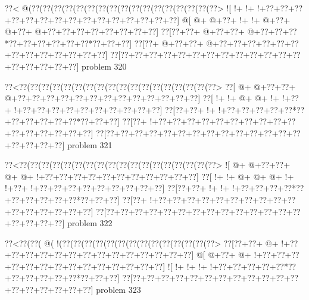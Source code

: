 \vbox{\vbox{\goo
\0??<\- @(\0??(\0??(\0??(\0??(\0??(\0??(\0??(\0??(\0??(\0??(\0??(\0??(\0??(\0??(\0??(\0??(\0??>
\- ![\- !+\- !+\- !+\0??+\0??+\0??+\0??+\0??+\0??+\0??+\0??+\0??+\0??+\0??+\0??+\0??+\0??+\0??]
\- @[\- @+\- @+\0??+\- !+\- !+\- @+\0??+\- @+\0??+\- @+\0??+\0??+\0??+\0??+\0??+\0??+\0??+\0??]
\0??[\0??+\0??+\- @+\0??+\0??+\- @+\0??+\0??+\0??*\0??+\0??+\0??+\0??+\0??+\0??*\0??+\0??+\0??]
\0??[\0??+\- @+\0??+\0??+\- @+\0??+\0??+\0??+\0??+\0??+\0??+\0??+\0??+\0??+\0??+\0??+\0??+\0??]
\0??[\0??+\0??+\0??+\0??+\0??+\0??+\0??+\0??+\0??+\0??+\0??+\0??+\0??+\0??+\0??+\0??+\0??+\0??]
}
\hfil problem 320\hfil\break
}



\vbox{\vbox{\goo
\0??<\0??(\0??(\0??(\0??(\0??(\0??(\0??(\0??(\0??(\0??(\0??(\0??(\0??(\0??(\0??(\0??(\0??(\0??>
\0??[\- @+\- @+\0??+\0??+\- @+\0??+\0??+\0??+\0??+\0??+\0??+\0??+\0??+\0??+\0??+\0??+\0??+\0??]
\0??[\- !+\- !+\- @+\- @+\- !+\- !+\0??+\- !+\0??+\0??+\0??+\0??+\0??+\0??+\0??+\0??+\0??+\0??]
\0??[\0??+\0??+\- !+\- !+\0??+\0??+\0??+\0??+\0??*\0??+\0??+\0??+\0??+\0??+\0??*\0??+\0??+\0??]
\0??[\0??+\- !+\0??+\0??+\0??+\0??+\0??+\0??+\0??+\0??+\0??+\0??+\0??+\0??+\0??+\0??+\0??+\0??]
\0??[\0??+\0??+\0??+\0??+\0??+\0??+\0??+\0??+\0??+\0??+\0??+\0??+\0??+\0??+\0??+\0??+\0??+\0??]
}
\hfil problem 321\hfil\break
}



\vbox{\vbox{\goo
\0??<\0??(\0??(\0??(\0??(\0??(\0??(\0??(\0??(\0??(\0??(\0??(\0??(\0??(\0??(\0??(\0??(\0??(\0??>
\- ![\- @+\- @+\0??+\0??+\- @+\- @+\- !+\0??+\0??+\0??+\0??+\0??+\0??+\0??+\0??+\0??+\0??+\0??]
\0??[\- !+\- !+\- @+\- @+\- @+\- !+\- !+\0??+\- !+\0??+\0??+\0??+\0??+\0??+\0??+\0??+\0??+\0??]
\0??[\0??+\0??+\- !+\- !+\- !+\0??+\0??+\0??+\0??*\0??+\0??+\0??+\0??+\0??+\0??*\0??+\0??+\0??]
\0??[\0??+\- !+\0??+\0??+\0??+\0??+\0??+\0??+\0??+\0??+\0??+\0??+\0??+\0??+\0??+\0??+\0??+\0??]
\0??[\0??+\0??+\0??+\0??+\0??+\0??+\0??+\0??+\0??+\0??+\0??+\0??+\0??+\0??+\0??+\0??+\0??+\0??]
}
\hfil problem 322\hfil\break
}



\vbox{\vbox{\goo
\0??<\0??(\0??(\- @(\- !(\0??(\0??(\0??(\0??(\0??(\0??(\0??(\0??(\0??(\0??(\0??(\0??(\0??(\0??>
\0??[\0??+\0??+\- @+\- !+\0??+\0??+\0??+\0??+\0??+\0??+\0??+\0??+\0??+\0??+\0??+\0??+\0??+\0??]
\- @[\- @+\0??+\- @+\- !+\0??+\0??+\0??+\0??+\0??+\0??+\0??+\0??+\0??+\0??+\0??+\0??+\0??+\0??]
\- ![\- !+\- !+\- !+\- !+\0??+\0??+\0??+\0??+\0??*\0??+\0??+\0??+\0??+\0??+\0??*\0??+\0??+\0??]
\0??[\0??+\0??+\0??+\0??+\0??+\0??+\0??+\0??+\0??+\0??+\0??+\0??+\0??+\0??+\0??+\0??+\0??+\0??]
}
\hfil problem 323\hfil\break
}



